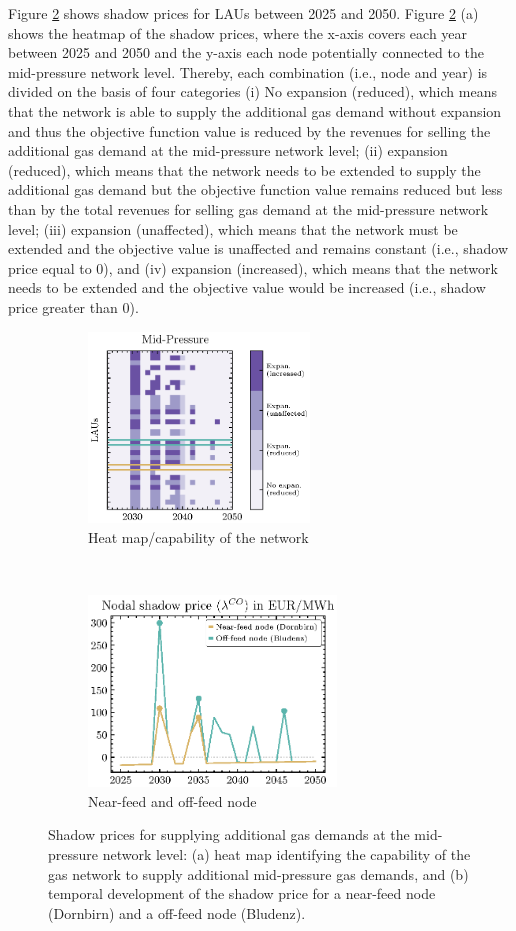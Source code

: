 Figure \ref{fig:2} shows shadow prices for LAUs between 2025 and 2050. Figure \ref{fig:2} (a) shows the heatmap of the shadow prices, where the x-axis covers each year between 2025 and 2050 and the y-axis each node potentially connected to the mid-pressure network level. Thereby, each combination (i.e., node and year) is divided on the basis of four categories (i) No expansion (reduced), which means that the network is able to supply the additional gas demand without expansion and thus the objective function value is reduced by the revenues for selling the additional gas demand at the mid-pressure network level; (ii) expansion (reduced), which means that the network needs to be extended to supply the additional gas demand but the objective function value remains reduced but less than by the total revenues for selling gas demand at the mid-pressure network level; (iii) expansion (unaffected), which means that the network must be extended and the objective value is unaffected and remains constant (i.e., shadow price equal to 0), and (iv) expansion (increased), which means that the network needs to be extended and the objective value would be increased (i.e., shadow price greater than 0).

\begin{figure}[t!]
	\centering
	\begin{subfigure}[t]{0.5\textwidth}
		\centering
		\includegraphics[height=2in]{figures/modelrun2/hm_shdprice.eps}
		\caption{Heat map/capability of the network}
		\label{fig:2a}
	\end{subfigure}%
	~ 
	\begin{subfigure}[t]{0.5\textwidth}
		\centering
		\includegraphics[height=2in]{figures/modelrun2/shadow_example.eps}
		\caption{Near-feed and off-feed node}
	\end{subfigure}
	\caption{Shadow prices for supplying additional gas demands at the mid-pressure network level: (a) heat map identifying the capability of the gas network to supply additional mid-pressure gas demands, and (b) temporal development of the shadow price for a near-feed node (Dornbirn) and a off-feed node (Bludenz).}
	\label{fig:2}
\end{figure}

